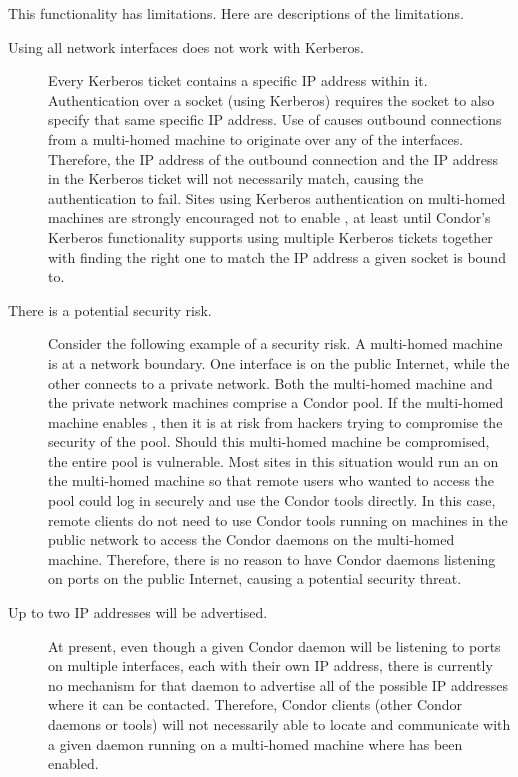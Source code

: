 This functionality has limitations.
Here are descriptions of the limitations.

\begin{description}

\item[Using all network interfaces does not work with Kerberos.] 
  Every Kerberos ticket contains a specific IP address within it.
  Authentication over a socket (using Kerberos) requires
  the socket to also specify that same specific IP address.
  Use of  causes outbound
  connections from a multi-homed machine to 
  originate over any of the interfaces.
  Therefore, the IP address of the outbound connection and the IP
  address in the Kerberos ticket will not necessarily match,
  causing the authentication to fail.
  Sites using Kerberos authentication on multi-homed machines are
  strongly encouraged not to enable ,
  at least until Condor's Kerberos functionality
  supports using multiple Kerberos tickets together with finding the right one
  to match the IP address a given socket is bound to. 

\item[There is a potential security risk.]
  Consider the following example of a security risk.
  A multi-homed machine is at a network boundary.
  One interface is on the public Internet, while the other connects to
  a private network.
  Both the multi-homed machine and the private network machines
  comprise a Condor pool.
  If the multi-homed machine enables ,
  then it is at risk from hackers trying to compromise the security of the pool.
  Should this multi-homed machine be compromised,
  the entire pool is vulnerable.
  Most sites in this situation would run an  on the
  multi-homed machine so that remote users who wanted to access the
  pool could log in securely and use the Condor tools directly.
  In this case, remote clients do not need to use Condor tools running
  on machines in the public network to access the Condor daemons on
  the multi-homed machine.
  Therefore, there is no reason to have Condor daemons listening on
  ports on the public Internet, causing a potential security threat.

\item[Up to two IP addresses will be advertised.]
  At present, even though a given Condor daemon will be listening to
  ports on multiple interfaces, each with their own IP address,
  there is currently no mechanism for that daemon to advertise all of
  the possible IP addresses where it can be contacted.
  Therefore, Condor clients (other Condor daemons or tools) will not
  necessarily able to locate and communicate with a given daemon
  running on a multi-homed machine where
   has been enabled.


\end{description}
